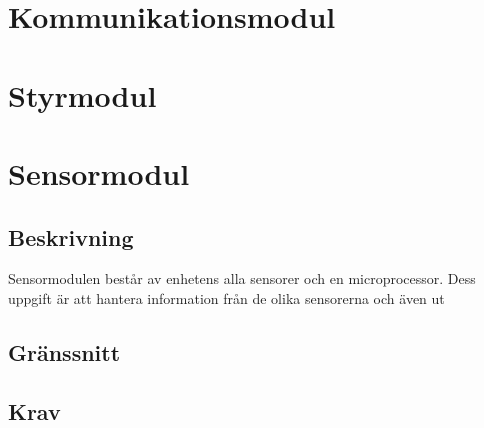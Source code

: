 \documentclass[kravspec/krav.tex]{subfiles}
\begin{document}
\section{Kommunikationsmodul}

\section{Styrmodul}

\section{Sensormodul}
\subsection{Beskrivning}
Sensormodulen består av enhetens alla sensorer och en microprocessor. Dess
uppgift är att hantera information från de olika sensorerna och även
ut
\subsection{Gränssnitt}
\subsection{Krav}
\end{document}
